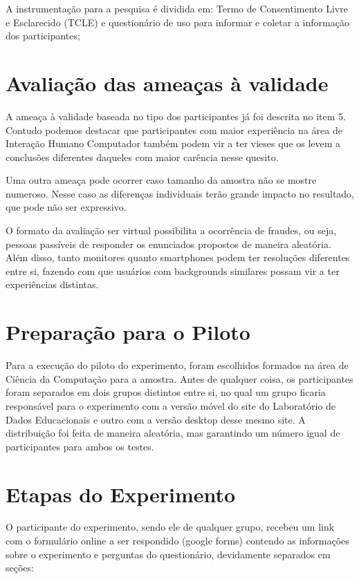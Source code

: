\documentclass[12pt]{article}
\begin{document}
A instrumentação para a pesquisa é dividida em: Termo de Consentimento Livre e Esclarecido (TCLE) e questionário de uso para informar e coletar a informação dos participantes;

\section{Avaliação das ameaças à validade}

A ameaça à validade baseada no tipo dos participantes já foi descrita no item 5. Contudo podemos destacar que participantes com maior experiência na área de Interação Humano Computador também podem vir a ter vieses que os levem a conclusões diferentes daqueles com maior carência nesse quesito.

Uma outra ameaça pode ocorrer caso tamanho da amostra não se mostre numeroso. Nesse caso as diferenças individuais terão grande impacto no resultado, que pode não ser expressivo.

O formato da avaliação ser virtual possibilita a ocorrência de fraudes, ou seja, pessoas passíveis de responder os enunciados propostos de maneira aleatória. Além disso, tanto monitores quanto smartphones podem ter resoluções diferentes entre si, fazendo com que usuários com backgrounds similares possam vir a ter experiências distintas.

\section{Preparação para o Piloto}

Para a execução do piloto do experimento, foram escolhidos formados na área de Ciência da Computação para a amostra. Antes de qualquer coisa, os participantes foram separados em dois grupos distintos entre si, no qual um grupo ficaria responsável para o experimento com a versão móvel do site do Laboratório de Dados Educacionais e outro com a versão desktop desse mesmo site. A distribuição foi feita de maneira aleatória, mas garantindo um número igual de participantes para ambos os testes.

\section{Etapas do Experimento}

O participante do experimento, sendo ele de qualquer grupo, recebeu um link com o formulário online a ser respondido (google forms) contendo as informações sobre o experimento e perguntas do questionário, devidamente separados em seções:
\end{document}
